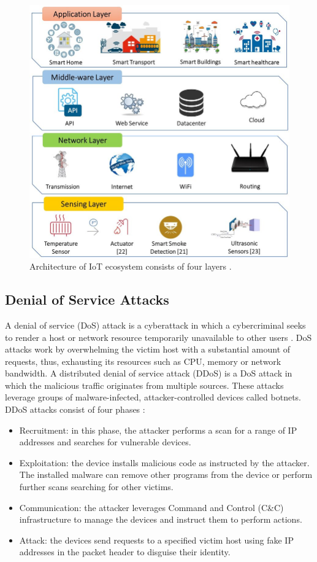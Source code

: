 \documentclass[conference, 11pt]{IEEEtran}
\begin{document}
    \begin{figure}[htbp]
        \centerline{\includegraphics[width=\linewidth]{figures/iot-architecture.jpg}}
        \caption{Architecture of IoT ecosystem consists of four layers \cite{article:9}.}
        \label{fig:iota}
    \end{figure}

    \subsection{Denial of Service Attacks}
    A denial of service (DoS) attack is a cyberattack in which a cybercriminal seeks to render a host or network resource temporarily unavailable to other users \cite{article:8}.
    DoS attacks work by overwhelming the victim host with a substantial amount of requests, thus, exhausting its resources such as CPU, memory or network bandwidth.
    A distributed denial of service attack (DDoS) is a DoS attack in which the malicious traffic originates from multiple sources.
    These attacks leverage groups of malware-infected, attacker-controlled devices called botnets.
    DDoS attacks consist of four phases \cite{article:8}:
    \begin{itemize}
        \item Recruitment: in this phase, the attacker performs a scan for a range of IP addresses and searches for vulnerable devices.
        \item Exploitation: the device installs malicious code as instructed by the attacker.
        The installed malware can remove other programs from the device or perform further scans searching for other victims.
        \item Communication: the attacker leverages Command and Control (C\&C) infrastructure to manage the devices and instruct them to perform actions.
        \item Attack: the devices send requests to a specified victim host using fake IP addresses in the packet header to disguise their identity.
    \end{itemize}
\end{document}
